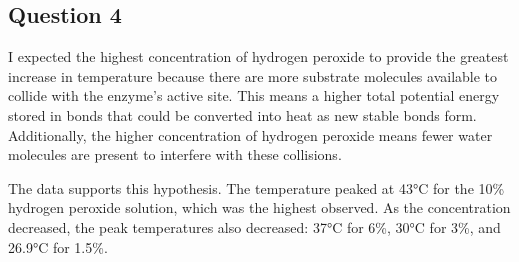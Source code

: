 \documentclass[12pt]{article}
\begin{document}
\subsection*{Question 4}
\begin{enumAlph}
    \item I expected the highest concentration of hydrogen peroxide to provide the greatest increase in temperature because there are more substrate molecules available to collide with the enzyme's active site. This means a higher total potential energy stored in bonds that could be converted into heat as new stable bonds form. Additionally, the higher concentration of hydrogen peroxide means fewer water molecules are present to interfere with these collisions.

    \item The data supports this hypothesis. The temperature peaked at 43°C for the 10\% hydrogen peroxide solution, which was the highest observed. As the concentration decreased, the peak temperatures also decreased: 37°C for 6\%, 30°C for 3\%, and 26.9°C for 1.5\%. 

    
\end{enumAlph}
\end{document}
